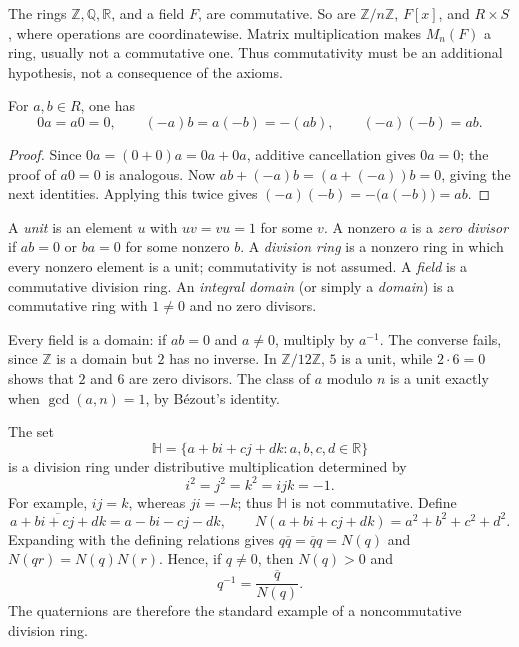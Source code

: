 The rings \(\mathbb Z,\mathbb Q,\mathbb R\), and a field \(F\), are
commutative. So are \(\mathbb Z/n\mathbb Z\), \(F[x]\), and \(R\times S\),
where operations are coordinatewise. Matrix multiplication makes \(M_n(F)\)
a ring, usually not a commutative one. Thus commutativity must be an
additional hypothesis, not a consequence of the axioms.

\begin{proposition}
For \(a,b\in R\), one has
\[0a=a0=0,\qquad (-a)b=a(-b)=-(ab),\qquad(-a)(-b)=ab.\]
\end{proposition}
\begin{proof}
Since \(0a=(0+0)a=0a+0a\), additive cancellation gives \(0a=0\);
the proof of \(a0=0\) is analogous. Now
\(ab+(-a)b=(a+(-a))b=0\), giving the next identities. Applying this twice
gives \((-a)(-b)=-\bigl(a(-b)\bigr)=ab\).
\end{proof}

\begin{definition}
A \emph{unit} is an element \(u\) with \(uv=vu=1\) for some \(v\).
A nonzero \(a\) is a \emph{zero divisor} if \(ab=0\) or \(ba=0\) for some
nonzero \(b\). A \emph{division ring} is a nonzero ring in which every
nonzero element is a unit; commutativity is not assumed.  A \emph{field} is
a commutative division ring.  An \emph{integral domain} (or simply a
\emph{domain}) is a commutative ring with \(1\ne0\) and no zero divisors.
\end{definition}

Every field is a domain: if \(ab=0\) and \(a\ne0\), multiply by \(a^{-1}\).
The converse fails, since \(\mathbb Z\) is a domain but \(2\) has no inverse.
In \(\mathbb Z/12\mathbb Z\), \(5\) is a unit, while \(2\cdot6=0\) shows
that \(2\) and \(6\) are zero divisors. The class of \(a\) modulo \(n\) is
a unit exactly when \(\gcd(a,n)=1\), by B\'ezout's identity.

\begin{example}
The set
\[
\mathbb H=\{a+bi+cj+dk:a,b,c,d\in\mathbb R\}
\]
is a division ring under distributive multiplication determined by
\[
i^2=j^2=k^2=ijk=-1.
\]
For example, \(ij=k\), whereas \(ji=-k\); thus \(\mathbb H\) is not
commutative.  Define
\[
\overline{a+bi+cj+dk}=a-bi-cj-dk,
\qquad N(a+bi+cj+dk)=a^2+b^2+c^2+d^2.
\]
Expanding with the defining relations gives
\(q\overline q=\overline q q=N(q)\) and
\(N(qr)=N(q)N(r)\).  Hence, if \(q\ne0\), then \(N(q)>0\) and
\[
q^{-1}=\frac{\overline q}{N(q)}.
\]
The quaternions are therefore the standard example of a noncommutative
division ring.
\end{example}

